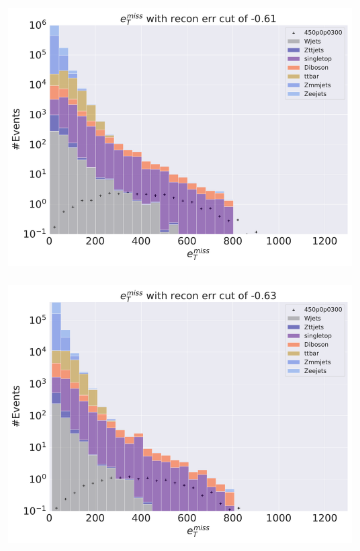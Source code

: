 \begin{figure}[H]
    \centering
    \begin{subfigure}{.45\textwidth}
        \includegraphics[width=\textwidth]{Figures/VAE_testing/big/2lep/b_data_recon_big_rm3_feats_sig_450p0p0300_recon_errcut_-0.61.pdf}
        \caption{ }
        \label{fig:VAE_2lep_big_450_cut_etmiss}
    \end{subfigure}
    \hfill
    \begin{subfigure}{.45\textwidth}
        \includegraphics[width=\textwidth]{Figures/VAE_testing/small/2lep/b_data_recon_big_rm3_feats_sig_450p0p0300_recon_errcut_-0.63.pdf}
        \caption{}
        \label{fig:VAE_2lep_small_450_cut_etmiss}
    \end{subfigure}

\end{figure}
